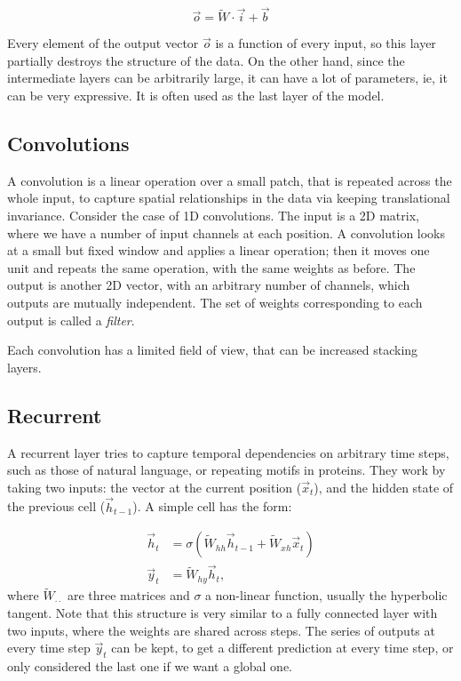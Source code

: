\begin{equation*}
\vec{o} = \widetilde W \cdot \vec{i} + \vec{b}
\end{equation*}

Every element of the output vector $\vec o$ is a function of every input, so this layer partially destroys the structure of the data.
On the other hand, since the intermediate layers can be arbitrarily large, it can have a lot of parameters, ie, it can be very expressive.
It is often used as the last layer of the model.

\subsection{Convolutions}
A convolution is a linear operation over a small patch, that is repeated across the whole input, to  capture spatial relationships in the data via keeping translational invariance.
Consider the case of 1D convolutions.
The input is a 2D matrix, where we have a number of input channels at each position.
A convolution looks at a small but fixed window and applies a linear operation; then it moves one unit and repeats the same operation, with the same weights as before.
The output is another 2D vector, with an arbitrary number of channels, which outputs are mutually independent.
The set of weights corresponding to each output is called a \emph{filter}.

Each convolution   has a limited field of view, that can be increased stacking layers.
 

\subsection{Recurrent}
A recurrent layer tries to capture temporal dependencies on arbitrary time steps, such as those of natural language, or repeating motifs in proteins.
They work by taking two inputs: the vector at the current position ($\vec x_t$), and the hidden state of the previous cell ($\vec h_{t-1}$).
A simple cell has the form:

\begin{align*}
\vec h_t &= \sigma\left(\widetilde W_{hh} \vec{h}_{t-1} + \widetilde W_{xh} \vec{x}_{t}\right) \\
\vec y_t &=  \widetilde W_{hy} \vec h_t,
\end{align*}
where $ \widetilde W_{\cdot \cdot}$ are three matrices and $\sigma$ a non-linear function, usually the hyperbolic tangent.
Note that this structure is very similar to a fully connected layer with two inputs, where the weights are shared across steps.
The series of outputs at every time step $\vec y_t$ can be kept, to get a different prediction at every time step, or only considered the last one if we want a global one.

